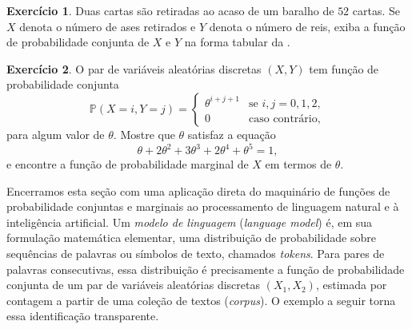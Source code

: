 \documentclass[12pt,portuguese]{article}
\theoremstyle{definition}
\newtheorem{exercise}{Exercício}
\begin{document}
\begin{exercise}\label{exercise:conjunta-ases-e-reis}
Duas cartas são retiradas ao acaso de um baralho de $52$ cartas. Se $X$
denota o número de ases retirados e $Y$ denota o número de reis, exiba a
função de probabilidade conjunta de $X$ e $Y$ na forma tabular da
.
\end{exercise}

\begin{exercise}\label{exercise:conjunta-theta-0-1-2}
O par de variáveis aleatórias discretas $(X, Y)$ tem função de probabilidade
conjunta
\[
  \mathbb{P}(X = i, Y = j) =
  \begin{cases}
    \theta^{i+j+1} & \text{se } i, j = 0, 1, 2, \\
    0 & \text{caso contrário},
  \end{cases}
\]
para algum valor de $\theta$. Mostre que $\theta$ satisfaz a equação
\[
  \theta + 2\theta^2 + 3\theta^3 + 2\theta^4 + \theta^5 = 1,
\]
e encontre a função de probabilidade marginal de $X$ em termos de $\theta$.
\end{exercise}

\bigskip

Encerramos esta seção com uma aplicação direta do maquinário de funções de
probabilidade conjuntas e marginais ao processamento de linguagem natural e à
inteligência artificial. Um \emph{modelo de linguagem} (\emph{language model})
é, em sua formulação matemática elementar, uma distribuição de probabilidade
sobre sequências de palavras ou símbolos de texto, chamados \emph{tokens}. Para
pares de palavras consecutivas, essa distribuição é precisamente a função de
probabilidade conjunta de um par de variáveis aleatórias discretas $(X_1, X_2)$,
estimada por contagem a partir de uma coleção de textos (\emph{corpus}). O
exemplo a seguir torna essa identificação transparente.
\end{document}
